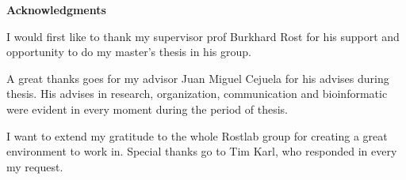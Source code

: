\clearemptydoublepage
{}
{}	



\vspace*{2cm}

\begin{center}
{\Large \bf Acknowledgments}
\end{center}

\vspace{1cm}




I would first like to thank my supervisor prof Burkhard Rost for his support and opportunity to do my master's thesis in his group.

 A great thanks goes for my advisor Juan Miguel Cejuela for his advises during thesis. His advises in research, organization, communication and bioinformatic were  evident in every moment during the period of thesis.  

I want  to extend my gratitude to the whole Rostlab group for creating a great environment to work in. Special thanks go to Tim Karl, who responded in every my request. 

